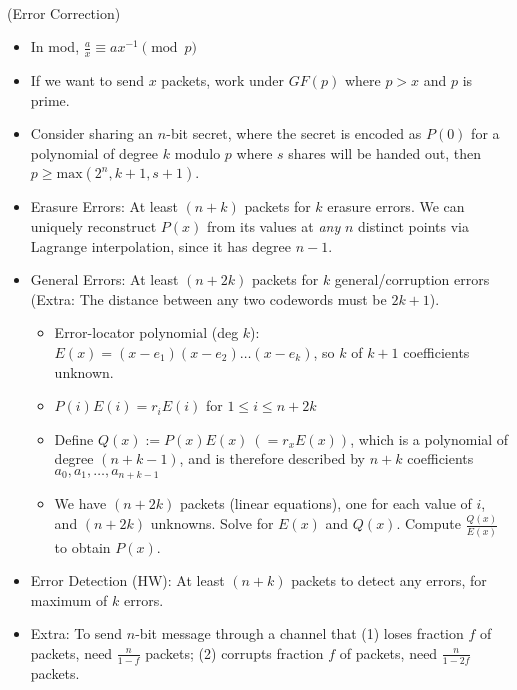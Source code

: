 \documentclass{article}
\begin{document}
\\
(Error Correction)
\begin{itemize}
	\item In mod, $\frac{a}{x} \equiv ax^{-1}\pmod{p}$
	\item If we want to send $x$ packets, work under $GF(p)$ where {\color{red} $p>x$} and $p$ is prime.
	\item Consider sharing an $n$-bit secret, where the secret is encoded as $P(0)$ for a polynomial of degree $k$ modulo $p$ where $s$ shares will be handed out, then $p\geq\text{max}(2^n, k+1, s+1)$.
	\item Erasure Errors: At least $(n+k)$ packets for $k$ erasure errors. We can uniquely reconstruct $P(x)$ from its values at \textit{any} $n$ distinct points via Lagrange interpolation, since it has degree $n-1$.
	\item General Errors: At least $(n+2k)$ packets for $k$ general/corruption errors (Extra: The distance between any two codewords must be $2k+1$).
	\begin{itemize}
		\item Error-locator polynomial (deg $k$): $E(x) = (x-e_1)(x-e_2)\dots(x-e_k)$, so $k$ of $k+1$ coefficients unknown.
		\item {\color{red} $P(i)E(i) = r_iE(i)$ for $1\leq i\leq n+2k$}
		\item Define $Q(x) := P(x)E(x)\ (= r_xE(x))$, which is a polynomial of degree $(n+k-1)$, and is therefore described by $n+k$ coefficients $a_0,a_1,\dots,a_{n+k-1}$
		\item We have $(n+2k)$ packets (linear equations), one for each value of $i$, and $(n+2k)$ unknowns. Solve for $E(x)$ and $Q(x)$. Compute $\frac{Q(x)}{E(x)}$ to obtain $P(x)$.
	\end{itemize}
	\item Error Detection (HW): At least $(n+k)$ packets to detect any errors, for maximum of $k$ errors.
	\item Extra: To send $n$-bit message through a channel that (1) loses fraction $f$ of packets, need $\frac{n}{1-f}$ packets; (2) corrupts fraction $f$ of packets, need $\frac{n}{1-2f}$ packets.
\end{itemize}
\end{document}
